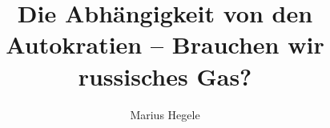 \documentclass[twoside, german]{sdqseminar}
\author{Marius Hegele}
\title{Die Abhängigkeit von den Autokratien -- Brauchen wir russisches Gas?}
\begin{document}
\setpdf

\maketitle

 

\begin{abstract}

\end{abstract}







\printbibliography[heading=bibintoc]
\end{document}
